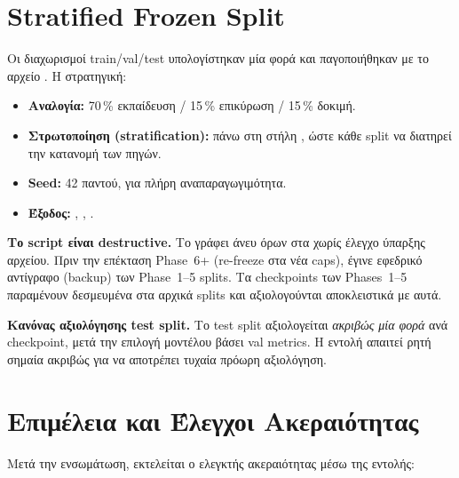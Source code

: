 \section{Stratified Frozen Split}

Οι διαχωρισμοί train/val/test υπολογίστηκαν μία φορά και παγοποιήθηκαν
με το αρχείο . Η στρατηγική:

\begin{itemize}
  \item \textbf{Αναλογία:} 70\,\% εκπαίδευση / 15\,\% επικύρωση / 15\,\% δοκιμή.
  \item \textbf{Στρωτοποίηση (stratification):} πάνω στη στήλη ,
    ώστε κάθε split να διατηρεί την κατανομή των πηγών.
  \item \textbf{Seed:} 42 παντού, για πλήρη αναπαραγωγιμότητα.
  \item \textbf{Έξοδος:} , ,
    .
\end{itemize}

\textbf{Το script είναι destructive.} Το  γράφει
άνευ όρων στα  χωρίς έλεγχο ύπαρξης αρχείου.
Πριν την επέκταση Phase~6+ (re-freeze στα νέα caps), έγινε εφεδρικό
αντίγραφο (backup) των Phase~1–5 splits. Τα checkpoints των Phases~1–5
παραμένουν δεσμευμένα στα αρχικά splits και αξιολογούνται αποκλειστικά
με αυτά.

\textbf{Κανόνας αξιολόγησης test split.} Το test split αξιολογείται
\emph{ακριβώς μία φορά} ανά checkpoint, μετά την επιλογή μοντέλου
βάσει val metrics. Η εντολή  απαιτεί ρητή σημαία
 ακριβώς για να αποτρέπει τυχαία
πρόωρη αξιολόγηση.

\section{Επιμέλεια και Έλεγχοι Ακεραιότητας}

Μετά την ενσωμάτωση, εκτελείται ο ελεγκτής ακεραιότητας μέσω της εντολής:

\begin{center}
\end{center}

